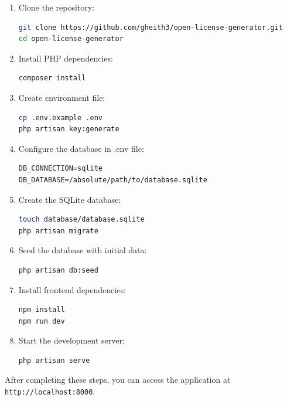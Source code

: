 \documentclass[12pt,a4paper]{report}
\begin{document}
\begin{enumerate}[label=\arabic*.]
    \item Clone the repository:
          \begin{lstlisting}[language=bash]
git clone https://github.com/gheith3/open-license-generator.git
cd open-license-generator
    \end{lstlisting}

    \item Install PHP dependencies:
          \begin{lstlisting}[language=bash]
composer install
    \end{lstlisting}

    \item Create environment file:
          \begin{lstlisting}[language=bash]
cp .env.example .env
php artisan key:generate
    \end{lstlisting}

    \item Configure the database in .env file:
          \begin{lstlisting}
DB_CONNECTION=sqlite
DB_DATABASE=/absolute/path/to/database.sqlite
    \end{lstlisting}

    \item Create the SQLite database:
          \begin{lstlisting}[language=bash]
touch database/database.sqlite
php artisan migrate
    \end{lstlisting}

    \item Seed the database with initial data:
          \begin{lstlisting}[language=bash]
php artisan db:seed
    \end{lstlisting}

    \item Install frontend dependencies:
          \begin{lstlisting}[language=bash]
npm install
npm run dev
    \end{lstlisting}

    \item Start the development server:
          \begin{lstlisting}[language=bash]
php artisan serve
    \end{lstlisting}
\end{enumerate}

After completing these steps, you can access the application at \texttt{http://localhost:8000}.
\end{document}
